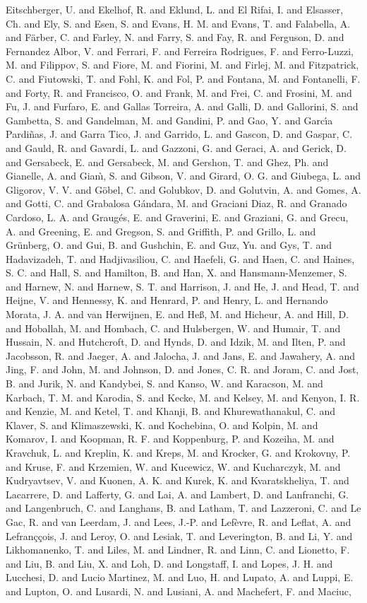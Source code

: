{Eitschberger, U. and Ekelhof, R. and Eklund, L. and El Rifai, I. and Elsasser, Ch. and Ely, S. and Esen, S. and Evans, H. M. and Evans, T. and Falabella, A. and F\"arber, C. and Farley, N. and Farry, S. and Fay, R. and Ferguson, D. and Fernandez Albor, V. and Ferrari, F. and Ferreira Rodrigues, F. and Ferro-Luzzi, M. and Filippov, S. and Fiore, M. and Fiorini, M. and Firlej, M. and Fitzpatrick, C. and Fiutowski, T. and Fohl, K. and Fol, P. and Fontana, M. and Fontanelli, F. and Forty, R. and Francisco, O. and Frank, M. and Frei, C. and Frosini, M. and Fu, J. and Furfaro, E. and Gallas Torreira, A. and Galli, D. and Gallorini, S. and Gambetta, S. and Gandelman, M. and Gandini, P. and Gao, Y. and Garc\'{\i}a Pardi\~nas, J. and Garra Tico, J. and Garrido, L. and Gascon, D. and Gaspar, C. and Gauld, R. and Gavardi, L. and Gazzoni, G. and Geraci, A. and Gerick, D. and Gersabeck, E. and Gersabeck, M. and Gershon, T. and Ghez, Ph. and Gianelle, A. and Gian\`{\i}, S. and Gibson, V. and Girard, O. G. and Giubega, L. and Gligorov, V. V. and G\"obel, C. and Golubkov, D. and Golutvin, A. and Gomes, A. and Gotti, C. and Grabalosa G\'andara, M. and Graciani Diaz, R. and Granado Cardoso, L. A. and Graug\'es, E. and Graverini, E. and Graziani, G. and Grecu, A. and Greening, E. and Gregson, S. and Griffith, P. and Grillo, L. and Gr\"unberg, O. and Gui, B. and Gushchin, E. and Guz, Yu. and Gys, T. and Hadavizadeh, T. and Hadjivasiliou, C. and Haefeli, G. and Haen, C. and Haines, S. C. and Hall, S. and Hamilton, B. and Han, X. and Hansmann-Menzemer, S. and Harnew, N. and Harnew, S. T. and Harrison, J. and He, J. and Head, T. and Heijne, V. and Hennessy, K. and Henrard, P. and Henry, L. and Hernando Morata, J. A. and van Herwijnen, E. and He\ss{}, M. and Hicheur, A. and Hill, D. and Hoballah, M. and Hombach, C. and Hulsbergen, W. and Humair, T. and Hussain, N. and Hutchcroft, D. and Hynds, D. and Idzik, M. and Ilten, P. and Jacobsson, R. and Jaeger, A. and Jalocha, J. and Jans, E. and Jawahery, A. and Jing, F. and John, M. and Johnson, D. and Jones, C. R. and Joram, C. and Jost, B. and Jurik, N. and Kandybei, S. and Kanso, W. and Karacson, M. and Karbach, T. M. and Karodia, S. and Kecke, M. and Kelsey, M. and Kenyon, I. R. and Kenzie, M. and Ketel, T. and Khanji, B. and Khurewathanakul, C. and Klaver, S. and Klimaszewski, K. and Kochebina, O. and Kolpin, M. and Komarov, I. and Koopman, R. F. and Koppenburg, P. and Kozeiha, M. and Kravchuk, L. and Kreplin, K. and Kreps, M. and Krocker, G. and Krokovny, P. and Kruse, F. and Krzemien, W. and Kucewicz, W. and Kucharczyk, M. and Kudryavtsev, V. and Kuonen, A. K. and Kurek, K. and Kvaratskheliya, T. and Lacarrere, D. and Lafferty, G. and Lai, A. and Lambert, D. and Lanfranchi, G. and Langenbruch, C. and Langhans, B. and Latham, T. and Lazzeroni, C. and Le Gac, R. and van Leerdam, J. and Lees, J.-P. and Lef\`evre, R. and Leflat, A. and Lefran\ifmmode \mbox{\c{c}}\else \c{c}\fi{}ois, J. and Leroy, O. and Lesiak, T. and Leverington, B. and Li, Y. and Likhomanenko, T. and Liles, M. and Lindner, R. and Linn, C. and Lionetto, F. and Liu, B. and Liu, X. and Loh, D. and Longstaff, I. and Lopes, J. H. and Lucchesi, D. and Lucio Martinez, M. and Luo, H. and Lupato, A. and Luppi, E. and Lupton, O. and Lusardi, N. and Lusiani, A. and Machefert, F. and Maciuc, }
